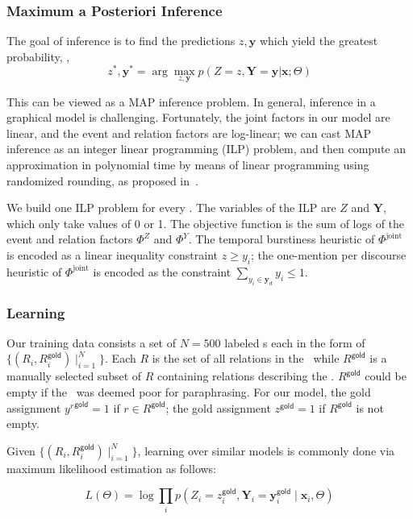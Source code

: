 

\subsubsection{Maximum a Posteriori Inference} 

The goal of inference is to
find the predictions $z,\mathbf{y}$ which yield the greatest
probability, \ie, \[z^*,\mathbf{y}^* = \arg\max_{z,\mathbf{y}} p(Z=z,
\mathbf{Y} = \mathbf{y}|\mathbf{x}; \Theta)\]

This can be viewed as a MAP inference problem. In general, inference in a
graphical model is challenging. Fortunately, the joint factors in our model are
linear, and the event and relation factors are log-linear; we can cast MAP
inference as an integer linear programming (ILP) problem, and then compute an
approximation in polynomial time by means of linear  programming using
randomized rounding, as proposed in~\cite{Yannakakis92}.


We build one ILP problem for every \eec. The variables of the ILP
are $Z$ and $\mathbf{Y}$, which only take values of 0 or 1.
The objective function is the sum of logs of the event and relation
factors $\Phi^Z$ and $\Phi^Y$. The temporal burstiness heuristic  of
$\Phi^{\text{joint}}$ is encoded as a linear inequality constraint $z\geq y_i$;
the one-mention per discourse heuristic of $\Phi^{\text{joint}}$ is encoded as 
the constraint $\sum_{y_i\in \mathbf{y}_d} y_i \leq 1$.


\def\gold{^{\mathsf{gold}}}

\subsubsection{Learning}

Our training data consists a set of $N=500$ labeled \bag s each in the form of
$\{(R_i,R\gold_i)\mid_{i=1}^N\}$. Each $R$ is the set of all relations
in the \bag\ while $R\gold$ is a manually selected subset of $R$
containing relations describing the \eec. $R\gold$ could be empty if
the \eec\ was deemed poor for paraphrasing. For our model, the gold
assignment ${y^r}\gold=1$ if $r\in R\gold$; the gold assignment
$z\gold=1$ if $R\gold$ is not empty.

Given $\{(R_i,R\gold_i)\mid_{i=1}^N\}$, learning over similar models is commonly
done via maximum likelihood estimation as follows:

\[
L(\Theta) = \log \prod_i p(Z_i=z\gold_i,\mathbf{Y}_i=\mathbf{y}\gold_i\mid\mathbf{x}_i,\Theta)
\]

